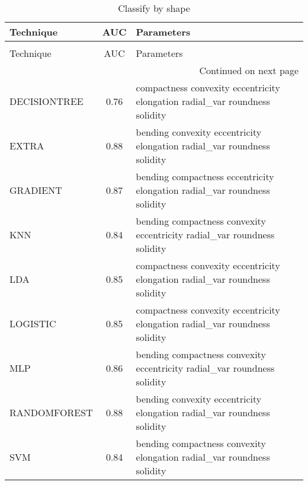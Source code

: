 \begin{longtable}{lcl}
\caption[Classify by shape]{Classify by shape}
\label{table:results-shape}\\
\toprule
   Technique &  AUC &                                                                  Parameters \\
\midrule
\endfirsthead
\caption[]{Classify by shape} \\
\toprule
   Technique &  AUC &                                                                  Parameters \\
\midrule
\endhead
\midrule
\multicolumn{3}{r}{{Continued on next page}} \\
\midrule
\endfoot

\bottomrule
\endlastfoot
DECISIONTREE & 0.76 & compactness convexity eccentricity elongation radial\_var roundness solidity \\
       EXTRA & 0.88 &     bending convexity eccentricity elongation radial\_var roundness solidity \\
    GRADIENT & 0.87 &   bending compactness eccentricity elongation radial\_var roundness solidity \\
         KNN & 0.84 &    bending compactness convexity eccentricity radial\_var roundness solidity \\
         LDA & 0.85 & compactness convexity eccentricity elongation radial\_var roundness solidity \\
    LOGISTIC & 0.85 & compactness convexity eccentricity elongation radial\_var roundness solidity \\
         MLP & 0.86 &    bending compactness convexity eccentricity radial\_var roundness solidity \\
RANDOMFOREST & 0.88 &     bending convexity eccentricity elongation radial\_var roundness solidity \\
         SVM & 0.84 &      bending compactness convexity elongation radial\_var roundness solidity \\
\end{longtable}
